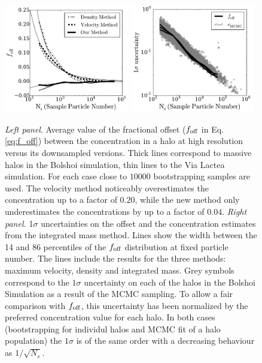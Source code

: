 \documentclass{emulateapj}
\begin{document}
\begin{figure}
\begin{center}
  \includegraphics[width=0.49\textwidth]{avg_foff_bolshoi.pdf}
  \includegraphics[width=0.48\textwidth]{sigma_foff_bolshoi.pdf}
\end{center}
\vspace{-0.5cm}
\caption{\emph{Left panel}. Average value of the fractional offset ($f_{\rm
    off}$ in Eq. \ref{eq:f_off}) between the concentration in a halo at
  high resolution versus its downsampled versions. 
  Thick lines
  correspond to massive halos in the Bolshoi simulation, thin lines to
  the Via Lactea simulation.
  For each case close to $10000$ bootstrapping samples are used.
  The velocity method noticeably overestimates the concentration up to
  a factor of $0.20$, 
  while the new method only underestimates the concentrations by up to
  a factor of $0.04$.
  \emph{Right panel.}
  1$\sigma$ uncertainties on the offset and the concentration
  estimates from the integrated mass method.  
  Lines show the width between the 14 and 86 percentiles
  of the $f_{\rm off}$ distribution at fixed particle number. 
  The lines include the results for the three methods: maximum
  velocity, density and integrated mass.
  Grey symbols correspond to the $1\sigma$ uncertainty on each of
  the halos in the Bolshoi Simulation as a result of the MCMC
  sampling. 
  To allow a fair comparison with $f_{\rm off}$, this uncertainty has
  been normalized by the preferred concentration value for each halo. 
  In both cases (bootstrapping for individul halos and MCMC fit of a
  halo population) the $1\sigma$ is of the same order with a
  decreasing behaviour as $1/\sqrt{N_s}$.
  \label{fig:downsampling}}
\end{figure}
\end{document}
